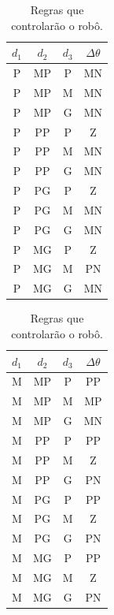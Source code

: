 				\begin{table}[H]
					\centering
					\caption{\label{tab:consequentes} Regras que controlarão o robô.}
					\setlength\tabcolsep{4pt}
					\begin{minipage}{0.30\textwidth}
					    \centering
						\begin{tabular}{| c | c | c | c |} 
						\hline
						\(d_1\) & \(d_2\) & \(d_3\) & \(\Delta \theta\) \\ \hline
						P & MP & P & MN  \\ \hline
						P & MP & M & MN \\ \hline
						P & MP & G & MN \\ \hline
						P & PP & P & Z  \\ \hline
						P & PP & M & MN \\ \hline
						P & PP & G & MN \\ \hline
						P & PG & P & Z  \\ \hline
						P & PG & M & MN \\ \hline
						P & PG & G & MN \\ \hline
						P & MG & P & Z  \\ \hline
						P & MG & M & PN \\ \hline
						P & MG & G & MN \\ \hline
						\end{tabular}	
					\end{minipage}	      
					\begin{minipage}{0.30\textwidth}
					    \centering
						\begin{tabular}{| c | c | c | c |} 
						\hline
						\(d_1\) & \(d_2\) & \(d_3\) & \(\Delta \theta\) \\ \hline
						M & MP & P & PP \\ \hline
						M & MP & M & MP \\ \hline
						M & MP & G & MN \\ \hline
						M & PP & P & PP \\ \hline
						M & PP & M & Z  \\ \hline
						M & PP & G & PN \\ \hline
						M & PG & P & PP \\ \hline
						M & PG & M & Z  \\ \hline
						M & PG & G & PN \\ \hline
						M & MG & P & PP \\ \hline
						M & MG & M & Z  \\ \hline
						M & MG & G & PN \\ \hline

\end{tabular}
\end{minipage}
\end{table}
